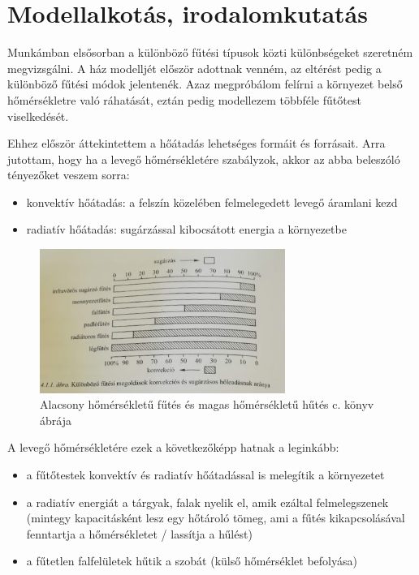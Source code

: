 \chapter{Modellalkotás, irodalomkutatás}

Munkámban elsősorban a különböző fűtési típusok közti különbségeket szeretném megvizsgálni. A ház modelljét először adottnak venném, az eltérést pedig a különböző fűtési módok jelentenék.
Azaz megpróbálom felírni a környezet belső hőmérsékletre való ráhatását, eztán pedig modellezem többféle fűtőtest viselkedését.

Ehhez először áttekintettem a hőátadás lehetséges formáit és forrásait. Arra jutottam, hogy ha a levegő hőmérsékletére szabályzok, akkor az abba beleszóló tényezőket veszem sorra:
\begin{itemize}[noitemsep,topsep=0pt,parsep=0pt,partopsep=0pt]
	\item konvektív hőátadás: a felszín közelében felmelegedett levegő áramlani kezd
	\item radiatív hőátadás: sugárzással kibocsátott energia a környezetbe
\end{itemize}

\begin{figure}[h]
	\centering
	\includegraphics[width=8cm]{figures/konvrad}
	\caption{Alacsony hőmérsékletű fűtés és magas hőmérsékletű hűtés c. könyv ábrája}
\end{figure}


A levegő hőmérsékletére ezek a következőképp hatnak a leginkább:
\begin{itemize}[noitemsep,topsep=0pt,parsep=0pt,partopsep=0pt]
	\item a fűtőtestek konvektív és radiatív hőátadással is melegítik a környezetet
	\item a radiatív energiát a tárgyak, falak nyelik el, amik ezáltal felmelegszenek (mintegy kapacitásként lesz egy hőtároló tömeg, ami a fűtés kikapcsolásával fenntartja a hőmérsékletet / lassítja a hűlést)
	\item a fűtetlen falfelületek hűtik a szobát (külső hőmérséklet befolyása)
\end{itemize}

